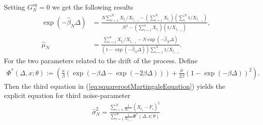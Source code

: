 Setting $G_N^{sq} = 0$ we get the following results
\begin{align}
    \exp\left(-\hat{\beta}_N\Delta\right) &= \frac{N\sum_{i=1}^{N}X_{t_i} / X_{t_{i - 1}} - \left(\sum_{i = 1}^{N}X_{t_i}\right)\left(\sum_{i}^{N}1/X_{t_{i - 1}}\right)}{N^2 - \left(\sum_{i = 1}^{n}X_{t_i}\right)\left(1/X_{t_{i - 1}}\right)},\\
    \hat{\mu}_N &= \frac{\sum_{i = 1}^{N}X_{t_i} / X_{t_{i - 1}} - N \exp\left(-\hat{\beta}_N\Delta\right)}{\left(1-\exp\left(-\hat{\beta}_N\Delta\right)\right)\sum_{i = 1}^{N}1/X_{t_{i - 1}}}.
\end{align}
For the two parameters related to the drift of the process. Define
\begin{align}
    \Phi^*(\Delta, x; \theta) := \left(\frac{x}{\beta}\left(\exp\left(-\beta\Delta - \exp\left(-2\beta \Delta\right)\right)\right) + \frac{\mu}{2\beta}\left(1-\exp\left(-\beta\Delta\right)\right)^2\right).
\end{align}
Then the third equation in (\ref{eq:squarerootMartingaleEquation}) yields the explicit equation for third noise-parameter
\begin{align}
    \hat{\sigma}^2_N = \frac{\sum_{i = 1}^{N}\frac{1}{X_{t_{i - 1}}}\left(X_{t_i} - F_i\right)^2}{\sum_{i = 1}^{N}\frac{1}{X_{t_{i - 1}}}\Phi^*(\Delta, x; \theta)}
\end{align}

